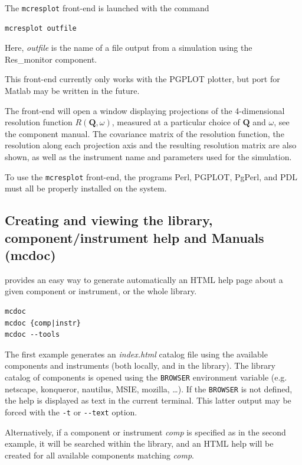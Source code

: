 The \verb+mcresplot+ front-end is launched with the command
\begin{lstlisting}
mcresplot outfile
\end{lstlisting}
Here, \textit{outfile\/} is the name of a file output from a simulation using
the Res\_monitor component.

This front-end currently only works with the PGPLOT plotter, but port for
Matlab may be written in the future.

The front-end will open a window displaying projections of the 4-dimensional
resolution function $R(\boldsymbol{Q}, \omega)$, measured at a
particular choice of $\boldsymbol{Q}$ and $\omega$, see the component
manual. The covariance matrix of the
resolution function, the resolution along each projection axis and the resulting
resolution matrix are also shown, as well as the instrument name and parameters
used for the simulation.

To use the \verb+mcresplot+ front-end, the programs Perl, PGPLOT, PgPerl,
and PDL must all be properly installed on the system.

\subsection{Creating and viewing the library, component/instrument help and
  Manuals (mcdoc)}
\label{s:mcdoc-run}

\MCS provides an easy way to generate automatically an HTML help page about a
given component or instrument, or the whole \MCS
library. 
\begin{lstlisting}
mcdoc
mcdoc {comp|instr}
mcdoc --tools
\end{lstlisting}
The first example generates an \textit{index.html} catalog file using the available
components and instruments (both locally, and in the \MCS library). The library
catalog of components is opened using the \verb+BROWSER+ environment variable
(e.g. netscape, konqueror, nautilus, MSIE,
mozilla, \ldots). If the \verb+BROWSER+ is not defined, the help is displayed as
text in the current terminal. This latter output may be forced with the
\verb+-t+ or \verb+--text+ option.

Alternatively, if a component or instrument \textit{comp} is specified as in the
second example, it will be searched within the library, and an HTML help will be
created for all available components matching \textit{comp}.

